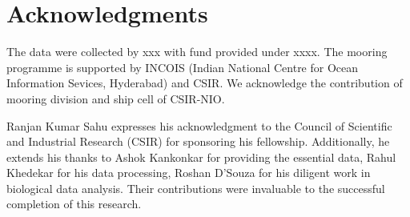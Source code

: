 \documentclass{article}
\begin{document}
	\section{Acknowledgments} 
	The data were collected by xxx with fund provided under xxxx. The mooring programme is supported by INCOIS (Indian National Centre for Ocean Information Sevices, Hyderabad) and CSIR. We acknowledge the contribution of mooring division and ship cell of CSIR-NIO. 
	
	Ranjan Kumar Sahu expresses his acknowledgment to the Council of Scientific and Industrial Research (CSIR) for sponsoring his fellowship. Additionally, he extends his thanks to Ashok Kankonkar for providing the essential data, Rahul Khedekar for his data processing, Roshan D'Souza for his diligent work in biological data analysis. Their contributions were invaluable to the successful completion of this research.

\linespread{1.5}	
{\footnotesize 	 %
}	

\newpage
{} 
\end{document}
